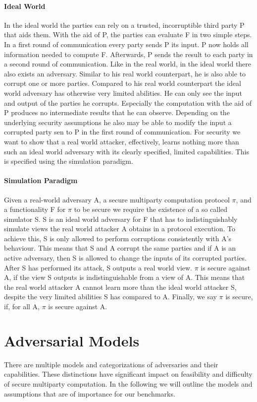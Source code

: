 \paragraph{Ideal World}
In the ideal world the parties can rely on a trusted, incorruptible third party P that aids them. With the aid of P, the parties can evaluate F in two simple steps. In a first round of communication every party sends P its input. P now holds all information needed to compute F. Afterwards, P sends the result to each party in a second round of communication. Like in the real world, in the ideal world there also exists an adversary. Similar to his real world counterpart, he is also able to corrupt one or more parties. Compared to his real world counterpart the ideal world adversary has otherwise very limited abilities. He can only see the input and output of the parties he corrupts. Especially the computation with the aid of P produces no intermediate results that he can observe. Depending on the underlying security assumptions he also may be able to modify the input a corrupted party sen to P in the first round of communication. For security we want to show that a real world attacker, effectively, learns nothing more than such an ideal world adversary with its clearly specified, limited capabilities. This is specified using the simulation paradigm.

\paragraph{Simulation Paradigm}
Given a real-world adversary A, a secure multiparty computation protocol $\pi $, and a functionality F for $\pi $ to be secure we require the existence of a so called simulator S.
S is an ideal world adversary for F that has to indistinguishably simulate views the real world attacker A obtains in a protocol execution. To achieve this, S is only allowed to perform corruptions consistently with A's behaviour. This means that S and A corrupt the same parties and if A is an active adversary, then S is allowed to change the inputs of its corrupted parties. After S has performed its attack, S outputs a real world view. $\pi $ is secure against A, if the view S outputs is indistinguishable from a view of A. This means that the real world attacker A cannot learn more than the ideal world attacker S, despite the very limited abilities S has compared to A. Finally, we say $\pi $ is secure, if, for all A, $\pi $ is secure against A. 

\section{Adversarial Models}
\label{sec:Adversarial Models}
There are multiple models and categorizations of adversaries and their capabilities. These distinctions have significant impact on feasibility and difficulty of secure multiparty computation. In the following we will outline the models and assumptions that are of importance for our benchmarks. 

